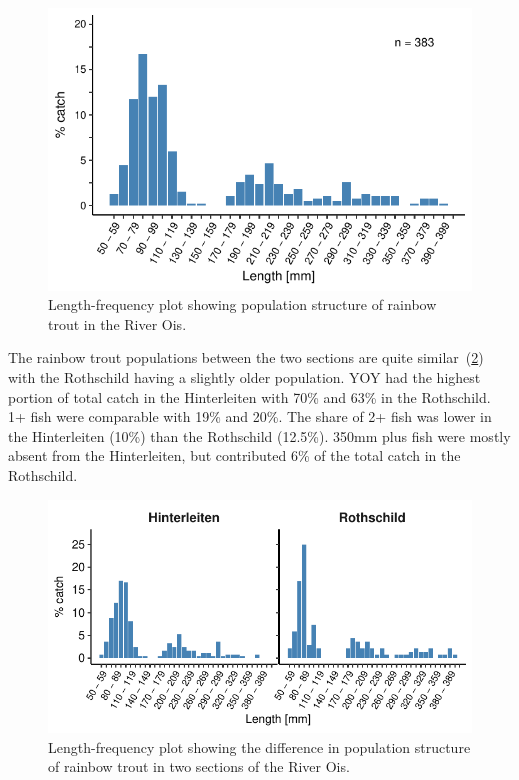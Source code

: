 \begin{figure}[!h]                              %
	\center
	\includegraphics[width=.7\textwidth]{images/rain_single.pdf}     %
	\caption{Length-frequency plot showing population structure of rainbow trout in the River Ois.}        %
	\label{fig:rain_single}           %
\end{figure}

The rainbow trout populations between the two sections are quite similar~(\cref{fig:rain_section}) with the Rothschild having a slightly older population.
YOY had the highest portion of total catch in the Hinterleiten with 70\% and 63\% in the Rothschild.
1+ fish were comparable with 19\% and 20\%.
The share of 2+ fish was lower in the Hinterleiten (10\%) than the Rothschild (12.5\%).
350mm plus fish were mostly absent from the Hinterleiten, but contributed 6\% of the total catch in the Rothschild.

\begin{figure}[!h]                              %
	\center
	\includegraphics{images/rain_section.pdf}    %
	\caption{Length-frequency plot showing the difference in population structure of rainbow trout in two sections of the River Ois.} %
	\label{fig:rain_section}     %
\end{figure}

